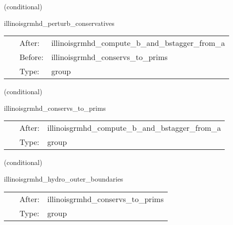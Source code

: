\documentclass{article}
\begin{document}
\vspace{5mm}

   (conditional) 

\hspace{5mm} illinoisgrmhd\_perturb\_conservatives 

\hspace{5mm}{\it perturb conservatives before con2prim } 


\hspace{5mm}

 \begin{tabular*}{160mm}{cll} 
~ & After:  & illinoisgrmhd\_compute\_b\_and\_bstagger\_from\_a \\ 
~ & Before:  & illinoisgrmhd\_conservs\_to\_prims \\ 
~ & Type:  & group \\ 
\end{tabular*} 


\vspace{5mm}

   (conditional) 

\hspace{5mm} illinoisgrmhd\_conservs\_to\_prims 

\hspace{5mm}{\it compute primitive variables from conservatives } 


\hspace{5mm}

 \begin{tabular*}{160mm}{cll} 
~ & After:  & illinoisgrmhd\_compute\_b\_and\_bstagger\_from\_a \\ 
~ & Type:  & group \\ 
\end{tabular*} 


\vspace{5mm}

   (conditional) 

\hspace{5mm} illinoisgrmhd\_hydro\_outer\_boundaries 

\hspace{5mm}{\it apply selected boundary conditions to the primitive variables } 


\hspace{5mm}

 \begin{tabular*}{160mm}{cll} 
~ & After:  & illinoisgrmhd\_conservs\_to\_prims \\ 
~ & Type:  & group \\ 
\end{tabular*} 
\end{document}
